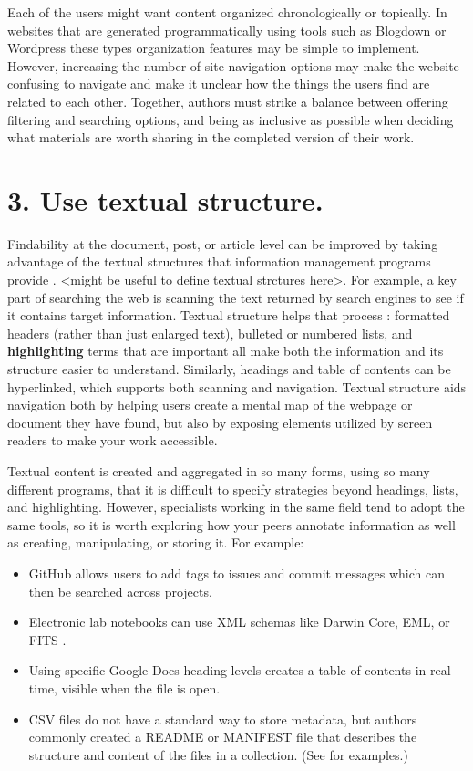 \documentclass[10pt,letterpaper]{article}
\newcommand{\rulemajor}[1]{\section*{#1}}
\begin{document}
\noindent
Each of the users might want content organized chronologically or topically.
In websites that are generated programmatically using tools such as Blogdown\cite{Xie2017} 
or Wordpress \cite{Williams2015} these types organization features may be simple to implement. 
However, increasing the number of site navigation options may make the website confusing 
to navigate and make it unclear how the things the users find are related to each other. 
Together, authors must strike a balance between offering filtering and searching options, 
and being as inclusive as possible when deciding what materials are worth sharing in 
the completed version of their work.

\rulemajor{3. Use textual structure.}

Findability at the document, post, or article level can be improved by taking
advantage of the textual structures that information management programs provide
\cite{Hedden2016}. <might be useful to define textual strctures here>. For example, 
a key part of searching the web is scanning the
text returned by search engines to see if it contains target information.
Textual structure helps that process \cite{Krug2014}: formatted headers (rather
than just enlarged text), bulleted or numbered lists, and \textbf{highlighting}
terms that are important all make both the information and its structure easier
to understand. Similarly, headings and table of contents can be hyperlinked,
which supports both scanning and navigation.
Textual structure aids navigation both by helping users create a mental map of the 
webpage or document they have found, but also by exposing elements utilized by 
screen readers to make your work accessible.

Textual content is created and aggregated in so many forms, using so many
different programs, that it is difficult to specify strategies beyond headings,
lists, and highlighting. However, specialists working in the same field tend to
adopt the same tools, so it is worth exploring how your peers annotate
information as well as creating, manipulating, or storing it. For example:

\begin{itemize}

\item
  GitHub allows users to add tags to issues and commit messages which can then
  be searched across projects.

\item
  Electronic lab notebooks can use XML schemas like Darwin Core, EML, or FITS
  \cite{Briney2015}.

\item
  Using specific Google Docs heading levels creates a table of contents in real
  time, visible when the file is open.

\item
  CSV files do not have a standard way to store metadata, but authors commonly
  created a README or MANIFEST file that describes the structure and content of
  the files in a collection. (See \cite{Pudding} for examples.)

\end{itemize}
\end{document}
